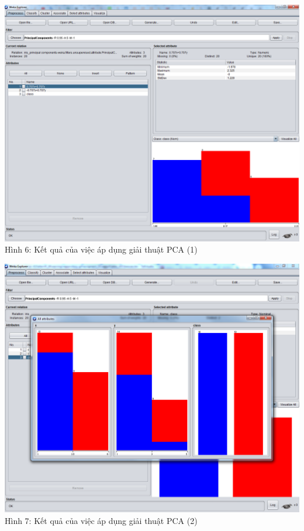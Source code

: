 \documentclass{hcmutarticle}
\begin{document}
\begin{center}
	\includegraphics[scale=0.4]{image/result_1.png}\\[0.5cm]
	Hình 6: Kết quả của việc áp dụng giải thuật PCA (1)
\end{center}

\begin{center}
	\includegraphics[scale=0.4]{image/resultAll.png}\\[0.5cm]
	Hình 7: Kết quả của việc áp dụng giải thuật PCA (2)
\end{center}
\end{document}

